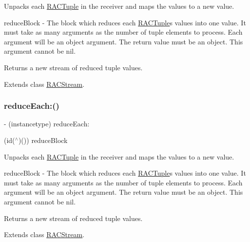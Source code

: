 Unpacks each \mbox{\hyperlink{interface_r_a_c_tuple}{R\+A\+C\+Tuple}} in the receiver and maps the values to a new value.

reduce\+Block -\/ The block which reduces each \mbox{\hyperlink{interface_r_a_c_tuple}{R\+A\+C\+Tuple}}\textquotesingle{}s values into one value. It must take as many arguments as the number of tuple elements to process. Each argument will be an object argument. The return value must be an object. This argument cannot be nil.

Returns a new stream of reduced tuple values. 

Extends class \mbox{\hyperlink{interface_r_a_c_stream_aaf04bf295d943b85860ae5cc3d5851ff}{R\+A\+C\+Stream}}.

\mbox{\label{category_r_a_c_stream_07_operations_08_aaf04bf295d943b85860ae5cc3d5851ff}} 
\subsubsection{\texorpdfstring{reduce\+Each\+:()}{reduceEach:()}\hspace{0.1cm}{\footnotesize\ttfamily [3/3]}}
{\footnotesize\ttfamily -\/ (instancetype) reduce\+Each\+: \begin{DoxyParamCaption}\item[{(id($^\wedge$)())}]{reduce\+Block }\end{DoxyParamCaption}}

Unpacks each \mbox{\hyperlink{interface_r_a_c_tuple}{R\+A\+C\+Tuple}} in the receiver and maps the values to a new value.

reduce\+Block -\/ The block which reduces each \mbox{\hyperlink{interface_r_a_c_tuple}{R\+A\+C\+Tuple}}\textquotesingle{}s values into one value. It must take as many arguments as the number of tuple elements to process. Each argument will be an object argument. The return value must be an object. This argument cannot be nil.

Returns a new stream of reduced tuple values. 

Extends class \mbox{\hyperlink{interface_r_a_c_stream_aaf04bf295d943b85860ae5cc3d5851ff}{R\+A\+C\+Stream}}.

\mbox{\label{category_r_a_c_stream_07_operations_08_aa86990e9bc4cbc3dff2815f56b907b41}} 
